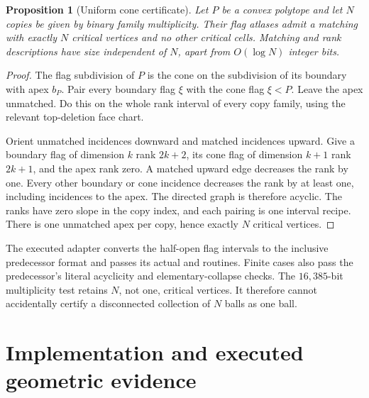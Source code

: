 \documentclass[11pt]{article}
\newtheorem{proposition}[theorem]{Proposition}
\theoremstyle{definition}\newtheorem{definition}[theorem]{Definition}
\theoremstyle{remark}\newtheorem{remark}[theorem]{Remark}
\newcommand{\code}[1]{\texttt{\detokenize{#1}}}
\begin{document}
\begin{proposition}[Uniform cone certificate]\label{prop:cone}
Let \(P\) be a convex polytope and let \(N\) copies be given by binary family multiplicity. Their flag atlases admit a matching with exactly \(N\) critical vertices and no other critical cells. Matching and rank descriptions have size independent of \(N\), apart from \(O(\log N)\) integer bits.
\end{proposition}
\begin{proof}
The flag subdivision of \(P\) is the cone on the subdivision of its boundary with apex \(b_P\). Pair every boundary flag \(\xi\) with the cone flag \(\xi<P\). Leave the apex unmatched. Do this on the whole rank interval of every copy family, using the relevant top-deletion face chart.

Orient unmatched incidences downward and matched incidences upward. Give a boundary flag of dimension \(k\) rank \(2k+2\), its cone flag of dimension \(k+1\) rank \(2k+1\), and the apex rank zero. A matched upward edge decreases the rank by one. Every other boundary or cone incidence decreases the rank by at least one, including incidences to the apex. The directed graph is therefore acyclic. The ranks have zero slope in the copy index, and each pairing is one interval recipe. There is one unmatched apex per copy, hence exactly \(N\) critical vertices.
\end{proof}

The executed adapter converts the half-open flag intervals to the inclusive predecessor format and passes its actual \code{prepare} and \code{verify_affine} routines. Finite cases also pass the predecessor's literal acyclicity and elementary-collapse checks. The \(16{,}385\)-bit multiplicity test retains \(N\), not one, critical vertices. It therefore cannot accidentally certify a disconnected collection of \(N\) balls as one ball.

\section{Implementation and executed geometric evidence}
\label{sec:implementation}
\end{document}
